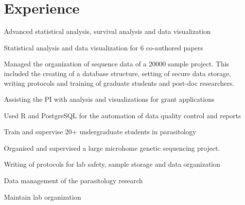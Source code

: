\documentclass[letterpaper]{deedy-resume} %
\begin{document}
\begin{minipage}[t]{0.66\textwidth} %


\section{Experience}

\vspace{\topsep} %
\begin{tightitemize}
\item Advanced statistical analysis, survival analysis and data visualization
\item Statistical analysis and data visualization for 6 co-authored papers
\item Managed the organization of sequence data of a 20000 sample project. This included the creating of a database structure, setting of secure data storage, writing protocols and training of graduate students and post-doc researchers.
\item Assisting the PI with analysis and visualizations for grant applications
\item Used R and PostgreSQL for the automation of data quality control and reports
\end{tightitemize}

\sectionspace %

\begin{tightitemize}
\item Train and supervise 20+ undergraduate students in parasitology
\item Organised and supervised a large microhome genetic sequencing project.
\item Writing of protocols for lab safety, sample storage and data organization
\item Data management of the parasitology research
\item Maintain lab organization
\end{tightitemize}


\end{minipage}
\end{document}
